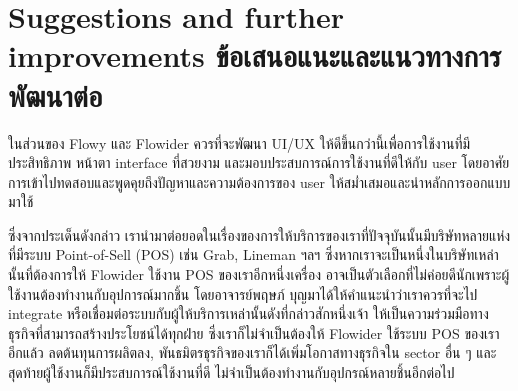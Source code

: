 \section{\ifenglish%
Suggestions and further improvements
\else%
ข้อเสนอแนะและแนวทางการพัฒนาต่อ
\fi
}
ในส่วนของ Flowy และ Flowider ควรที่จะพัฒนา UI/UX ให้ดีขึ้นกว่านี้เพื่อการใช้งานที่มีประสิทธิภาพ หน้าตา interface ที่สวยงาม และมอบประสบการณ์การใช้งานที่ดีให้กับ user โดยอาศัยการเข้าไปทดสอบและพูดคุยถึงปัญหาและความต้องการของ user ให้สม่ำเสมอและนำหลักการออกแบบมาใช้

ซึ่งจากประเด็นดังกล่าว เรานำมาต่อยอดในเรื่องของการให้บริการของเราที่ปัจจุบันนั้นมีบริษัทหลายแห่งที่มีระบบ Point-of-Sell (POS) เช่น Grab, Lineman ฯลฯ ซึ่งหากเราจะเป็นหนึ่งในบริษัทเหล่านั้นที่ต้องการให้ Flowider ใช้งาน POS ของเราอีกหนึ่งเครื่อง อาจเป็นตัวเลือกที่ไม่ค่อยดีนักเพราะผู้ใช้งานต้องทำงานกับอุปการณ์มากชิ้น โดยอาจารย์พฤษภ์ บุญมาได้ให้คำแนะนำว่าเราควรที่จะไป integrate หรือเชื่อมต่อระบบกับผู้ให้บริการเหล่านั้นดังที่กล่าวสักหนึ่งเจ้า ให้เป็นความร่วมมือทางธุรกิจที่สามารถสร้างประโยชน์ได้ทุกฝ่าย ซึ่งเราก็ไม่จำเป็นต้องให้ Flowider ใช้ระบบ POS ของเราอีกแล้ว ลดต้นทุนการผลิตลง, พันธมิตรธุรกิจของเราก็ได้เพิ่มโอกาสทางธุรกิจใน sector อื่น ๆ และสุดท้ายผู้ใช้งานก็มีประสบการณ์ใช้งานที่ดี ไม่จำเป็นต้องทำงานกับอุปกรณ์หลายชิ้นอีกต่อไป
